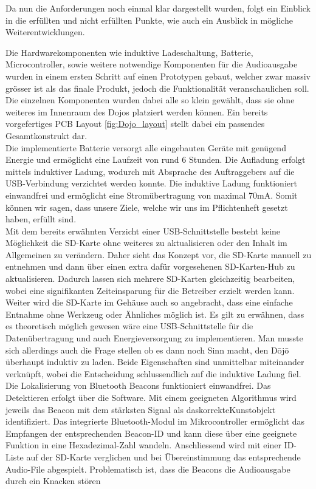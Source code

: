 Da nun die Anforderungen noch einmal klar dargestellt wurden, folgt ein Einblick in die erfüllten und nicht erfüllten Punkte, wie auch ein Ausblick in mögliche Weiterentwicklungen.
 
Die Hardwarekomponenten wie induktive Ladeschaltung, Batterie, Microcontroller, sowie weitere notwendige Komponenten für die Audioausgabe wurden in einem ersten Schritt auf einen Prototypen gebaut, welcher zwar massiv grösser ist als das finale Produkt, jedoch die Funktionalität veranschaulichen soll. Die einzelnen Komponenten wurden dabei alle so klein gewählt, dass sie ohne weiteres im Innenraum des Dojos platziert werden können. Ein bereits vorgefertiges PCB Layout \ref{fig:Dojo_layout} stellt dabei ein passendes Gesamtkonstrukt dar.\\

Die implementierte Batterie versorgt alle eingebauten Geräte mit genügend Energie und ermöglicht eine Laufzeit von rund 6 Stunden. Die Aufladung erfolgt mittels induktiver Ladung, wodurch mit Absprache des Auftraggebers auf die USB-Verbindung verzichtet werden konnte. Die induktive Ladung funktioniert einwandfrei und ermöglicht eine Stromübertragung von maximal 70mA. Somit können wir sagen, dass unsere Ziele, welche wir uns im Pflichtenheft gesetzt haben, erfüllt sind.\\

Mit dem bereits erwähnten Verzicht einer USB-Schnittstelle besteht keine Möglichkeit die SD-Karte ohne weiteres zu aktualisieren oder den Inhalt im Allgemeinen zu verändern. Daher sieht das Konzept vor, die SD-Karte manuell zu entnehmen und dann über einen extra dafür vorgesehenen SD-Karten-Hub zu aktualisieren. Dadurch lassen sich mehrere SD-Karten gleichzeitig bearbeiten, wobei eine signifikanten Zeiteinsparung für die Betreiber erzielt werden kann. Weiter wird die SD-Karte im Gehäuse auch so angebracht, dass eine einfache Entnahme ohne Werkzeug oder Ähnliches möglich ist.
Es gilt zu erwähnen, dass es theoretisch möglich gewesen wäre eine USB-Schnittstelle für die Datenübertragung und auch Energieversorgung zu implementieren. Man musste sich allerdings auch die Frage stellen ob es dann noch Sinn macht, den Dōjō überhaupt induktiv zu laden. Beide Eigenschaften sind unmittelbar miteinander verknüpft, wobei die Entscheidung schlussendlich auf die induktive Ladung fiel.\\

Die Lokalisierung von Bluetooth Beacons funktioniert einwandfrei. Das Detektieren erfolgt über die Software. Mit einem geeigneten Algorithmus wird jeweils das Beacon mit dem stärksten Signal als das\glqq korrekte\grqq Kunstobjekt identifiziert. Das integrierte Bluetooth-Modul im Mikrocontroller ermöglicht das Empfangen der entsprechenden Beacon-ID und kann diese über eine geeignete Funktion in eine Hexadezimal-Zahl wandeln. Anschliessend wird mit einer ID-Liste auf der SD-Karte verglichen und bei Übereinstimmung das entsprechende Audio-File abgespielt. Problematisch ist, dass die Beacons die Audioausgabe durch ein Knacken stören\\

